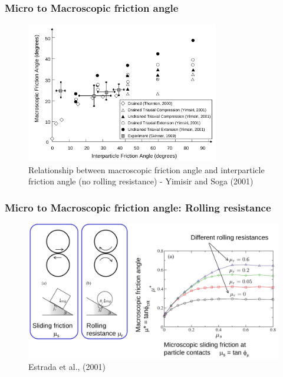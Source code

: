 \documentclass[notes]{beamer}
\begin{document}
\begin{frame}
\frametitle{Micro to Macroscopic friction angle}
\begin{figure}
	\includegraphics[width=0.75\textwidth]{figs/macroscopic-interparticle-friction.png}
	\caption*{Relationship between macroscopic friction angle and interparticle friction angle (no rolling resistance) - Yimisir and Soga (2001)}
\end{figure}
\end{frame}


\begin{frame}
\frametitle{Micro to Macroscopic friction angle: Rolling resistance}
\begin{figure}
	\includegraphics[width=\textwidth]{figs/rolling-resistance.png}
	\caption*{Estrada et al., (2001)}
\end{figure}
\end{frame}
\end{document}
